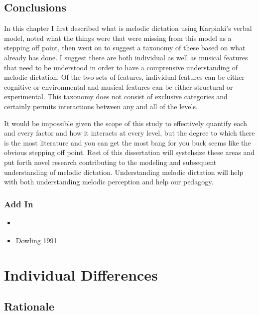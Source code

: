 \documentclass[]{book}
\providecommand{\tightlist}{%
  \setlength{\itemsep}{0pt}\setlength{\parskip}{0pt}}
\begin{document}
\hypertarget{conclusions}{%
\section{Conclusions}\label{conclusions}}

In this chapter I first described what is melodic dictation using Karpinki's verbal model, noted what the things were that were missing from this model as a stepping off point, then went on to suggest a taxonomy of these based on what already has done.
I suggest there are both individual as well as musical features that need to be understood in order to have a comprensive understanding of melodic dictation.
Of the two sets of features, individual features can be either cognitive or environmental and musical features can be either structural or experimental.
This taxonomy does not consist of exclusive categories and certainly permits interactions between any and all of the levels.

It would be impossible given the scope of this study to effectively quantify each and every factor and how it interacts at every level, but the degree to which there is the most literature and you can get the most bang for you buck seems like the obvious stepping off point.
Rest of this dissertation will systehsize these areas and put forth novel research contributing to the modeling and subsequent understanding of melodic dictation.
Understanding melodic dictation will help with both understanding melodic perception and help our pedagogy.

\hypertarget{add-in}{%
\subsection{Add In}\label{add-in}}

\begin{itemize}
\tightlist
\item
  \citep{hansenWorkingMemoryMusical2013}
\item
  Dowling 1991 \citep{dowlingTonalStrengthMelody1991}
\end{itemize}

\hypertarget{individual-differences}{%
\chapter{Individual Differences}\label{individual-differences}}

\hypertarget{rationale-1}{%
\section{Rationale}\label{rationale-1}}
\end{document}
